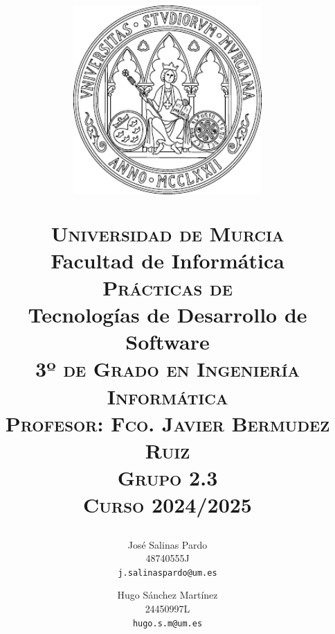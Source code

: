 \documentclass[11pt]{article}
\begin{document}
\title{
	\vspace{-5ex}
	\begin{figure}[H]
		\centering
		\includegraphics[width=72mm]{umu-logo}
	\end{figure}
	
	{\Large \textsc{Universidad de Murcia}}\\
	{\Large Facultad de Informática}\\ [12.5ex]
	{\Large \textsc{Prácticas de}\\ [1ex]}
	{\Huge Tecnologías de Desarrollo de Software}\\ [1ex]
	{\Large \textsc{3º de Grado en Ingeniería Informática}}\\
	{\Large \textsc{Profesor: Fco. Javier Bermudez Ruiz}} \\
	{\Large \textsc{Grupo 2.3}} \\
	{\Large \textsc{Curso 2024/2025}} \\ 
	\vspace{10ex}
}

\author{
	{\Large José Salinas Pardo}\\[0.5ex]
	48740555J\\
	\texttt{j.salinaspardo@um.es}
	\and
	{\Large Hugo Sánchez Martínez}\\[0.5ex]
	24450997L\\
	\texttt{hugo.s.m@um.es}\\
}

\pagestyle{fancy}
\fancyhf{}
\fancyhead[LE]{\nouppercase{\rightmark} \hfill \textbf{\nouppercase{\leftmark}}}   %
\fancyhead[RO]{\nouppercase{\rightmark}}  %
\setlength{\headheight}{25pt}  %
\fancyfoot[C]{\thepage}
\end{document}
